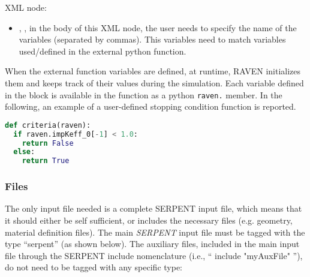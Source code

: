 \begin{itemize}
                                                             XML node:
                                                            \begin{itemize}
                                                              \item {}, , in the body of
                                                              this XML node, the user needs to specify the name of the variables (separated by commas).
                                                              This variables need to match variables used/defined in the external python
                                                              function.
                                                            \end{itemize}
                                                            When the external function variables are defined, at runtime, RAVEN initializes
                                                            them and keeps track of their values during the simulation.
                                                            Each variable defined in the  block is available in the
                                                            function as a python \texttt{raven.} member. In the following, an example of a
                                                            user-defined stopping condition function is reported.
                                                            
\begin{lstlisting}[language=python]
def criteria(raven):
  if raven.impKeff_0[-1] < 1.0:
    return False
  else:
    return True
\end{lstlisting}

\end{itemize}

\subsubsection{Files}
The only input file needed is a complete SERPENT input file,
which means that it should either be self sufficient, or includes
the necessary files (e.g. geometry, material definition files).
The main \textit{SERPENT} input file must be tagged with the
type ``serpent'' (as shown below). The auxiliary files, included in the
main input file through the SERPENT include nomenclature (i.e., `` include "myAuxFile" ''),
do not need to be tagged with any specific type:

